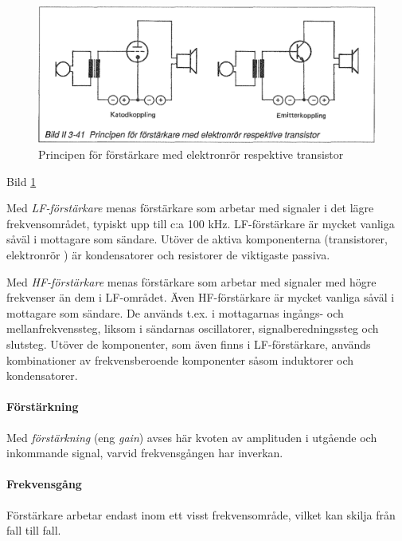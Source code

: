 \begin{figure}[h]
\begin{center}
\includegraphics[width=14cm]{images/bild_2_3-41}
\caption{Principen för förstärkare med elektronrör respektive transistor}
\label{fig:BildII3-41}
\end{center}
\end{figure}

Bild \ref{fig:BildII3-41}

Med \emph{LF-förstärkare} menas förstärkare som arbetar med signaler i
det lägre frekvensområdet, typiskt upp till c:a 100
kHz. LF-förstärkare är mycket vanliga såväl i mottagare som
sändare. Utöver de aktiva komponenterna (transistorer, elektronrör )
är kondensatorer och resistorer de viktigaste passiva.

Med \emph{HF-förstärkare} menas förstärkare som arbetar med signaler
med högre frekvenser än dem i LF-området. Även HF-förstärkare är
mycket vanliga såväl i mottagare som sändare. De används t.ex. i
mottagarnas ingångs- och mellanfrekvenssteg, liksom i sändarnas
oscillatorer, signalberedningssteg och slutsteg.  Utöver de
komponenter, som även finns i LF-förstärkare, används kombinationer av
frekvensberoende komponenter såsom induktorer och kondensatorer.

\paragraph{Förstärkning}
Med \emph{förstärkning} (eng \emph{gain}) avses här kvoten av amplituden i utgående och
inkommande signal, varvid frekvensgången har inverkan.

\paragraph{Frekvensgång}
Förstärkare arbetar endast inom ett visst frekvensområde, vilket kan
skilja från fall till fall.

